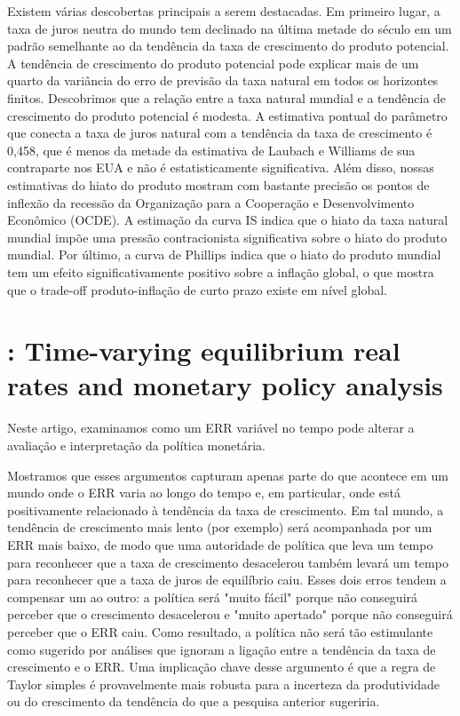 Existem várias descobertas principais a serem destacadas. Em primeiro lugar, a taxa de juros neutra do mundo tem declinado na última metade do século em um padrão semelhante ao da tendência da taxa de crescimento do produto potencial. A tendência de crescimento do produto potencial pode explicar mais de um quarto da variância do erro de previsão da taxa natural em todos os horizontes finitos. Descobrimos que a relação entre a taxa natural mundial e a tendência de crescimento do produto potencial é modesta. A estimativa pontual do parâmetro que conecta a taxa de juros natural com a tendência da taxa de crescimento é 0,458, que é menos da metade da estimativa de Laubach e Williams de sua contraparte nos EUA e não é estatisticamente significativa. Além disso, nossas estimativas do hiato do produto mostram com bastante precisão os pontos de inflexão da recessão da Organização para a Cooperação e Desenvolvimento Econômico (OCDE). A estimação da curva IS indica que o hiato da taxa natural mundial impõe uma pressão contracionista significativa sobre o hiato do produto mundial. Por último, a curva de Phillips indica que o hiato do produto mundial tem um efeito significativamente positivo sobre a inflação global, o que mostra que o trade-off produto-inflação de curto prazo existe em nível global.
%
%
\section{\citet{Wu:2007}: Time-varying equilibrium real rates and monetary policy analysis}
Neste artigo, examinamos como um ERR variável no tempo pode alterar a avaliação e interpretação da política monetária.

Mostramos que esses argumentos capturam apenas parte do que acontece em um mundo onde o ERR varia ao longo do tempo e, em particular, onde está positivamente relacionado à tendência da taxa de crescimento. Em tal mundo, a tendência de crescimento mais lento (por exemplo) será acompanhada por um ERR mais baixo, de modo que uma autoridade de política que leva um tempo para reconhecer que a taxa de crescimento desacelerou também levará um tempo para reconhecer que a taxa de juros de equilíbrio caiu. Esses dois erros tendem a compensar um ao outro: a política será "muito fácil" porque não conseguirá perceber que o crescimento desacelerou e "muito apertado" porque não conseguirá perceber que o ERR caiu. Como resultado, a política não será tão estimulante como sugerido por análises que ignoram a ligação entre a tendência da taxa de crescimento e o ERR. Uma implicação chave desse argumento é que a regra de Taylor simples é provavelmente mais robusta para a incerteza da produtividade ou do crescimento da tendência do que a pesquisa anterior sugeriria.

